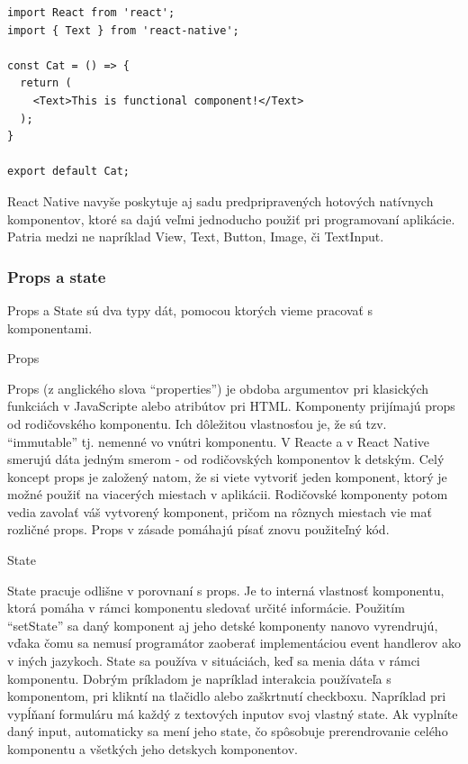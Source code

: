 \begin{itemize}[leftmargin=*]
\begin{lstlisting}[caption={Príklad function komponentu}, label={funcComponent}]
import React from 'react';
import { Text } from 'react-native';

const Cat = () => {
  return (
    <Text>This is functional component!</Text>
  );
}

export default Cat;
\end{lstlisting}

\end{itemize}

React Native navyše poskytuje aj sadu predpripravených hotových natívnych komponentov, ktoré sa dajú veľmi jednoducho použiť pri programovaní aplikácie. Patria medzi ne napríklad View, Text, Button, Image, či TextInput.

\subsubsection{Props a state}
Props a State sú dva typy dát, pomocou ktorých vieme pracovať s komponentami.
\begin{itemize}[leftmargin=*]
{\bf \item Props} \newline
Props (z anglického slova ``properties'') je obdoba argumentov pri klasických funkciách v JavaScripte alebo atribútov pri HTML. Komponenty prijímajú props od rodičovského komponentu. Ich dôležitou vlastnosťou je, že sú tzv. ``immutable'' tj. nemenné vo vnútri komponentu. V Reacte a v React Native smerujú dáta jedným smerom - od rodičovských komponentov k detským. Celý koncept props je založený natom, že si viete vytvoriť jeden komponent, ktorý je možné použiť na viacerých miestach v aplikácii. Rodičovské komponenty potom vedia zavolať váš vytvorený komponent, pričom na rôznych miestach vie mať rozličné props. Props v zásade pomáhajú písať znovu použiteľný kód.
{\bf \item State} \newline
State pracuje odlišne v porovnaní s props. Je to interná vlastnosť komponentu, ktorá pomáha v rámci komponentu sledovať určité informácie. Použitím ``setState'' sa daný komponent aj jeho detské komponenty nanovo vyrendrujú, vďaka čomu sa nemusí programátor zaoberať implementáciou event handlerov ako v iných jazykoch. State sa používa v situáciách, keď sa menia dáta v rámci komponentu. Dobrým príkladom je napríklad interakcia používateľa s komponentom, pri klikntí na tlačidlo alebo zaškrtnutí checkboxu. Napríklad pri vypĺňaní formuláru má každý z textových inputov svoj vlastný state. Ak vyplníte daný input, automaticky sa mení jeho state, čo spôsobuje prerendrovanie celého komponentu a všetkých jeho detskych komponentov. 
\end{itemize}
